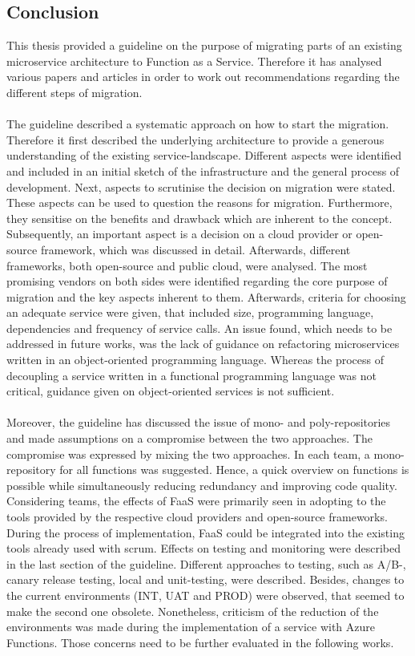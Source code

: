 \documentclass[a4paper,11pt, pagesize]{scrartcl}
\begin{document}
\begin{spacing}{1.2}
\section{Conclusion}
This thesis provided a guideline on the purpose of migrating parts of an existing microservice architecture to Function as a Service. Therefore it has analysed various papers and articles in order to work out recommendations regarding the different steps of migration. \\\\The guideline described a systematic approach on how to start the migration. Therefore it first described the underlying architecture to provide a generous understanding of the existing service-landscape. Different aspects were identified and included in an initial sketch of the infrastructure and the general process of development. Next, aspects to scrutinise the decision on migration were stated. These aspects can be used to question the reasons for migration. Furthermore, they sensitise on the benefits and drawback which are inherent to the concept. Subsequently, an important aspect is a decision on a cloud provider or open-source framework, which was discussed in detail. Afterwards, different frameworks, both open-source and public cloud, were analysed. The most promising vendors on both sides were identified regarding the core purpose of migration and the key aspects inherent to them. Afterwards, criteria for choosing an adequate service were given, that included size, programming language, dependencies and frequency of service calls. An issue found,  which needs to be addressed in future works, was the lack of guidance on refactoring microservices written in an object-oriented programming language. Whereas the process of decoupling a service written in a functional programming language was not critical, guidance given on object-oriented services is not sufficient.
\\\\Moreover, the guideline has discussed the issue of mono- and poly-repositories and made assumptions on a compromise between the two approaches. The compromise was expressed by mixing the two approaches. In each team, a mono-repository for all functions was suggested. Hence, a quick overview on functions is possible while simultaneously reducing redundancy and improving code quality. Considering teams, the effects of FaaS were primarily seen in adopting to the tools provided by the respective cloud providers and open-source frameworks. During the process of implementation, FaaS could be integrated into the existing tools already used with scrum. Effects on testing and monitoring were described in the last section of the guideline. Different approaches to testing, such as A/B-, canary release testing, local and unit-testing, were described. Besides, changes to the current environments (INT, UAT and PROD) were observed, that seemed to make the second one obsolete. Nonetheless, criticism of the reduction of the environments was made during the implementation of a service with Azure Functions. Those concerns need to be further evaluated in the following works.   
\newpage
\begin{spacing}{1}
  \printbibliography%
\end{spacing}
\end{spacing}
\end{document}
